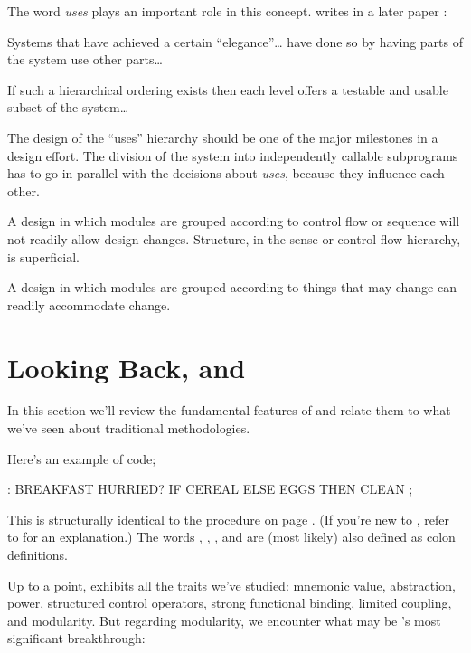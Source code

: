 The word \emph{uses} plays an important role in this concept.
%
writes in a later paper \cite{parnas79}:

\begin{tfquot}
Systems that have achieved a certain ``elegance''\dots{} have done so
by having parts of the system use other parts\dots{}

If such a hierarchical ordering exists then each level offers a
testable and usable subset of the system\dots{}

The design of the ``uses'' hierarchy should be one of the major
milestones in a design effort. The division of the system into
independently callable subprograms has to go in parallel with the
decisions about \emph{uses}, because they influence each other.
\end{tfquot}
A design in which modules are grouped according to control flow or
sequence will not readily allow design changes. Structure, in the
sense or control-flow hierarchy, is superficial.

A design in which modules are grouped according to things that may
change can readily accommodate change.%
%


\section{Looking Back, and \Forth{}}%
In this section we'll review the fundamental features of \Forth{} and
relate them to what we've seen about traditional methodologies.

Here's an example of \Forth{} code;
\begin{Code}
: BREAKFAST
   HURRIED?  IF  CEREAL  ELSE  EGGS  THEN CLEAN ;
\end{Code}
This is structurally identical to the procedure  on
page \pageref{fig-fig1-4}. (If you're new to \Forth{}, refer to
 for an explanation.)  The words ,
, , and  are (most likely) also
defined as colon definitions.

Up to a point, \Forth{} exhibits all the traits we've studied: mnemonic
value, abstraction, power, structured control operators, strong
functional binding, limited coupling, and modularity. But regarding
modularity, we encounter what may be \Forth{}'s most significant
breakthrough:

